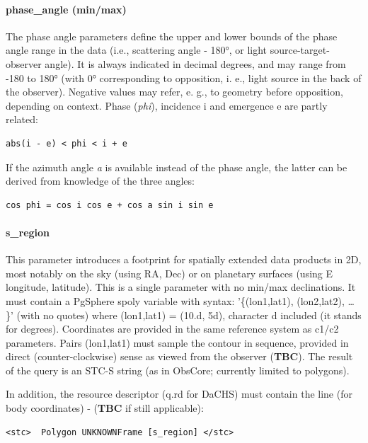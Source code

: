 \documentclass[11pt,a4paper]{ivoa}
\begin{document}
\paragraph{phase\_angle (min/max)}

The phase angle parameters define the upper and lower bounds of the phase angle range in the data (i.e., scattering angle - 180°, or light source-target-observer angle). It is always indicated in decimal degrees, and may range from -180 to 180° (with 0° corresponding to opposition, i. e., light source in the back of the observer). Negative values may refer, e. g., to geometry before opposition, depending on context. Phase (\emph{phi}), incidence i and emergence e are partly related:

\begin{verbatim}
abs(i - e) < phi < i + e
\end{verbatim}

If the azimuth angle \emph{a} is available instead of the phase angle, the latter can be derived from knowledge of the three angles:

\begin{verbatim}
cos phi = cos i cos e + cos a sin i sin e
\end{verbatim}

\paragraph{s\_region}

This parameter introduces a footprint for spatially extended data products in 2D, most notably on the sky (using RA, Dec) or on planetary surfaces (using E longitude, latitude). This is a single parameter with no min/max declinations. It must contain a PgSphere spoly variable with syntax: '\{(lon1,lat1), (lon2,lat2), … \}' (with no quotes) where (lon1,lat1) = (10.d, 5d), character d included (it stands for degrees). Coordinates are provided in the same reference system as c1/c2 parameters. Pairs (lon1,lat1) must sample the contour in sequence, provided in direct (counter-clockwise) sense as viewed from the observer (\textbf{TBC}). The result of the query is an STC-S string (as in ObsCore; currently limited to polygons).

In addition, the resource descriptor (q.rd for DaCHS) must contain the line (for body coordinates) - (\textbf{TBC} if still applicable):

\begin{verbatim}
<stc>  Polygon UNKNOWNFrame [s_region] </stc>
\end{verbatim}
\end{document}
